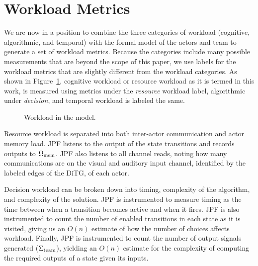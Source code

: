 \section{Workload Metrics}
We are now in a position to combine the three categories of workload (cognitive, algorithmic, and temporal) with the formal model of the actors and team to generate a set of workload metrics.  Because the categories include many possible measurements that are beyond the scope of this paper, we use labels for the workload metrics that are slightly different from the workload categories.  As shown in Figure~\ref{fig:WorkloadMetrics}, cognitive workload or resource workload as it is termed in this work, is measured using metrics under the {\em resource} workload label, algorithmic under {\em decision}, and temporal workload is labeled the same. 


\begin{figure}[h]
\center
\setlength{\abovecaptionskip}{1mm}
\setlength{\belowcaptionskip}{1mm}
\setlength{\textfloatsep}{1mm}
\setlength{\floatsep}{1mm}
\caption{Workload in the model.}
\label{fig:WorkloadMetrics}
\end{figure}

Resource workload is separated into both inter-actor communication and actor memory load. JPF listens to the output of the state transitions and records outputs to $\Omega_{\rm mem}$.  JPF also listens to all channel reads, noting how many communications are on the visual and auditory input channel, identified by the labeled edges of the DiTG, of each actor. 

Decision workload can be broken down into timing, complexity of the algorithm, and complexity of the solution. JPF is instrumented to measure timing as the time between when a transition becomes active and when it fires.  JPF is also instrumented to count the number of enabled transitions in each state as it is visited, giving us an $O(n)$ estimate of how the number of choices affects workload.   Finally, JPF is instrumented to count the number of output signals generated ($\Sigma_{\rm team}$), yielding an $O(n)$ estimate for the complexity of computing the required outputs of a state given its inputs.

